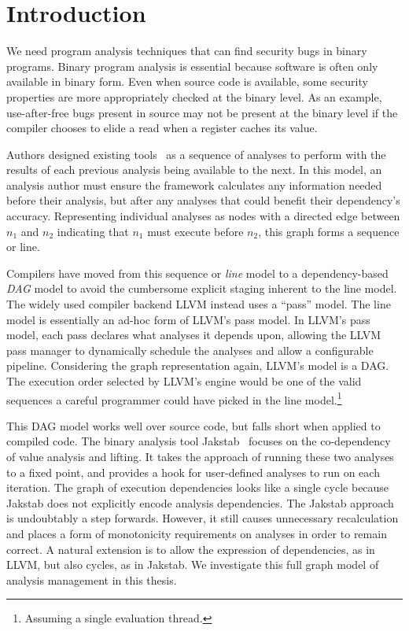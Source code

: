 \chapter{Introduction}
We need program analysis techniques that can find security bugs in binary programs.
Binary program analysis is essential because software is often only available in binary form.
Even when source code is available, some security properties are more appropriately checked at the binary level.
As an example, use-after-free bugs present in source may not be present at the binary level if the compiler chooses to elide a read when a register caches its value.

Authors designed existing tools~\cite{ida, bap, bitblaze, bindead} as a sequence of analyses to perform with the results of each previous analysis being available to the next.
In this model, an analysis author must ensure the framework calculates any information needed before their analysis, but after any analyses that could benefit their dependency's accuracy.
Representing individual analyses as nodes with a directed edge between $n_1$ and $n_2$ indicating that $n_1$ must execute before $n_2$, this graph forms a sequence or line.

Compilers have moved from this sequence or \emph{line} model to a dependency-based \emph{DAG} model to avoid the cumbersome explicit staging inherent to the line model.
The widely used compiler backend LLVM\cite{llvm} instead uses a ``pass'' model.
The line model is essentially an ad-hoc form of LLVM's pass model.
In LLVM's pass model, each pass declares what analyses it depends upon, allowing the LLVM pass manager to dynamically schedule the analyses and allow a configurable pipeline.
Considering the graph representation again, LLVM's model is a DAG.
The execution order selected by LLVM's engine would be one of the valid sequences a careful programmer could have picked in the line model.\footnote{Assuming a single evaluation thread.}

This DAG model works well over source code, but falls short when applied to compiled code.
The binary analysis tool Jakstab~\cite{jakstab} focuses on the co-dependency of value analysis and lifting. 
It takes the approach of running these two analyses to a fixed point, and provides a hook for user-defined analyses to run on each iteration.
The graph of execution dependencies looks like a single cycle because Jakstab does not explicitly encode analysis dependencies.
The Jakstab approach is undoubtably a step forwards.
However, it still causes unnecessary recalculation and places a form of monotonicity requirements on analyses in order to remain correct.
A natural extension is to allow the expression of dependencies, as in LLVM, but also cycles, as in Jakstab.
We investigate this full graph model of analysis management in this thesis.

